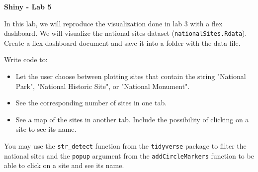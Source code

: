 \documentclass[letterpaper, 12pt]{article}
\begin{document}
\begin{center}
\textbf{\Large{Shiny - Lab 5}}
\end{center}

\vspace{2em}

In this lab, we will reproduce the visualization done in lab 3 with a flex dashboard. We will visualize the national sites dataset (\verb|nationalSites.Rdata|). Create a flex dashboard document and save it into a folder with the data file.

\vspace{1em}

Write code to:
\begin{itemize}
	\item Let the user choose between plotting sites that contain the string "National Park", "National Historic Site", or "National Monument".
	\item See the corresponding number of sites in one tab.
	\item See a map of the sites in another tab. Include the possibility of clicking on a site to see its name.
\end{itemize}

\vspace{1em}

You may use the \verb|str_detect| function from the \verb|tidyverse| package to filter the national sites and the \verb|popup| argument from the \verb|addCircleMarkers| function to be able to click on a site and see its name.
 
\end{document}
